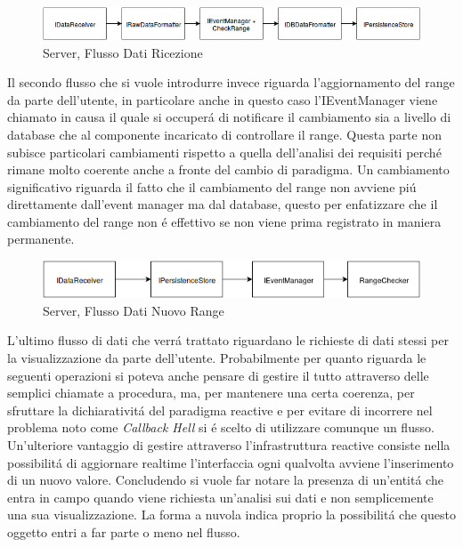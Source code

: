 \begin{figure}[h]
\centering
\includegraphics[width=\textwidth]{Figures/LogicArchitecture/Server/FlowDiagramReceiveData}
\caption{Server, Flusso Dati Ricezione}
\end{figure}

Il secondo flusso che si vuole introdurre invece riguarda l'aggiornamento del range da parte dell'utente, in particolare anche in questo caso l'IEventManager viene chiamato in causa il quale si occuper\'a di notificare il cambiamento sia a livello di database che al componente incaricato di controllare il range. Questa parte non subisce particolari cambiamenti rispetto a quella dell'analisi dei requisiti perch\'e rimane molto coerente anche a fronte del cambio di paradigma. Un cambiamento significativo riguarda il fatto che il cambiamento del range non avviene pi\'u direttamente dall'event manager ma dal database, questo per enfatizzare che il cambiamento del range non \'e effettivo se non viene prima registrato in maniera permanente.

\begin{figure}[h]
\centering
\includegraphics[width=\textwidth]{Figures/LogicArchitecture/Server/FlowDiagramNewRange}
\caption{Server, Flusso Dati Nuovo Range}
\end{figure}

L'ultimo flusso di dati che verr\'a trattato riguardano le richieste di dati stessi per la visualizzazione da parte dell'utente. Probabilmente per quanto riguarda le seguenti operazioni si poteva anche pensare di gestire il tutto attraverso delle semplici chiamate a procedura, ma, per mantenere una certa coerenza, per sfruttare la dichiarativit\'a del paradigma reactive e per evitare di incorrere nel problema noto come \textit{Callback Hell} si \'e scelto di utilizzare comunque un flusso. Un'ulteriore vantaggio di gestire attraverso l'infrastruttura reactive consiste nella possibilit\'a di aggiornare realtime l'interfaccia ogni qualvolta avviene l'inserimento di un nuovo valore. Concludendo si vuole far notare la presenza di un'entit\'a che entra in campo quando viene richiesta un'analisi sui dati e non semplicemente una sua visualizzazione. La forma a nuvola indica proprio la possibilit\'a che questo oggetto entri a far parte o meno nel flusso.

